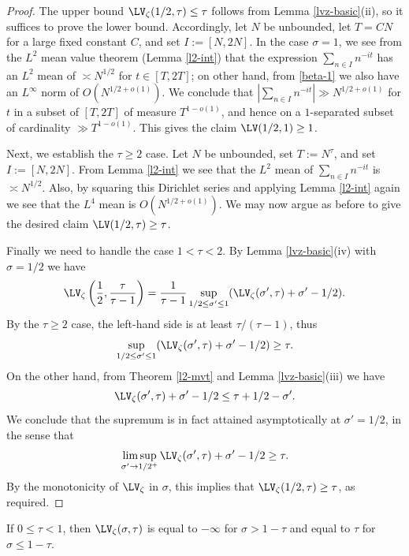 \begin{proof}  The upper bound $\LV_\zeta(1/2,\tau) \leq \tau$  follows from Lemma \ref{lvz-basic}(ii), so it suffices to prove the lower bound.  Accordingly, let $N$ be unbounded, let $T  = CN$ for a large fixed constant $C$, and set $I := [N,2N]$.  In the case $\sigma=1$, we see from the $L^2$ mean value theorem (Lemma \ref{l2-int}) that the expression $\sum_{n \in I} n^{-it}$ has an $L^2$ mean of $\asymp N^{1/2}$ for $t \in [T,2T]$; on other hand, from \eqref{beta-1} we also have an $L^\infty$ norm of $O(N^{1/2+o(1)})$.  We conclude that $|\sum_{n \in I} n^{-it}| \gg N^{1/2+o(1)}$ for $t$ in a subset of $[T,2T]$ of measure $T^{1-o(1)}$, and hence on a $1$-separated subset of cardinality $\gg T^{1-o(1)}$.  This gives the claim $\LV(1/2,1) \geq 1$.

    Next, we establish the $\tau \geq 2$ case.
    Let $N$ be unbounded, set $T := N^\tau$, and set $I := [N,2N]$.  From Lemma \ref{l2-int} we see that the $L^2$ mean of $\sum_{n \in I} n^{-it}$ is $\asymp N^{1/2}$.  Also, by squaring this Dirichlet series and applying Lemma \ref{l2-int} again we see that the $L^4$ mean is $O(N^{1/2+o(1)})$.  We may now argue as before to give the desired claim $\LV(1/2,\tau) \geq \tau$.

    Finally we need to handle the case $1 < \tau < 2$. By Lemma \ref{lvz-basic}(iv) with $\sigma=1/2$ we have
    $$ \LV_\zeta\left(\frac{1}{2}, \frac{\tau}{\tau-1}\right) = \frac{1}{\tau-1}  \sup_{1/2 \leq \sigma' \leq 1} (\LV_\zeta(\sigma',\tau) + \sigma'-1/2).$$
    By the $\tau \geq 2$ case, the left-hand side is at least $\tau/(\tau-1)$, thus
    $$ \sup_{1/2 \leq \sigma' \leq 1} (\LV_\zeta(\sigma',\tau) + \sigma'-1/2) \geq \tau.$$
    On the other hand, from Theorem \ref{l2-mvt} and Lemma \ref{lvz-basic}(iii) we have
    $$ \LV_\zeta(\sigma',\tau) + \sigma'-1/2 \leq \tau + 1/2 - \sigma'.$$
    We conclude that the supremum is in fact attained asymptotically at $\sigma'=1/2$, in the sense that
    $$ \limsup_{\sigma' \to 1/2^+} \LV_\zeta(\sigma',\tau) + \sigma'-1/2 \geq \tau.$$
    By the monotonicity of $\LV_\zeta$ in $\sigma$, this implies that $\LV_\zeta(1/2,\tau) \geq \tau$, as required.
\end{proof}

\begin{lemma}\label{lvz-small-tau} If $0 \leq \tau < 1$, then $\LV_\zeta(\sigma,\tau)$ is equal to $-\infty$ for $\sigma > 1-\tau$ and equal to $\tau$ for $\sigma \leq 1-\tau$.
\end{lemma}

